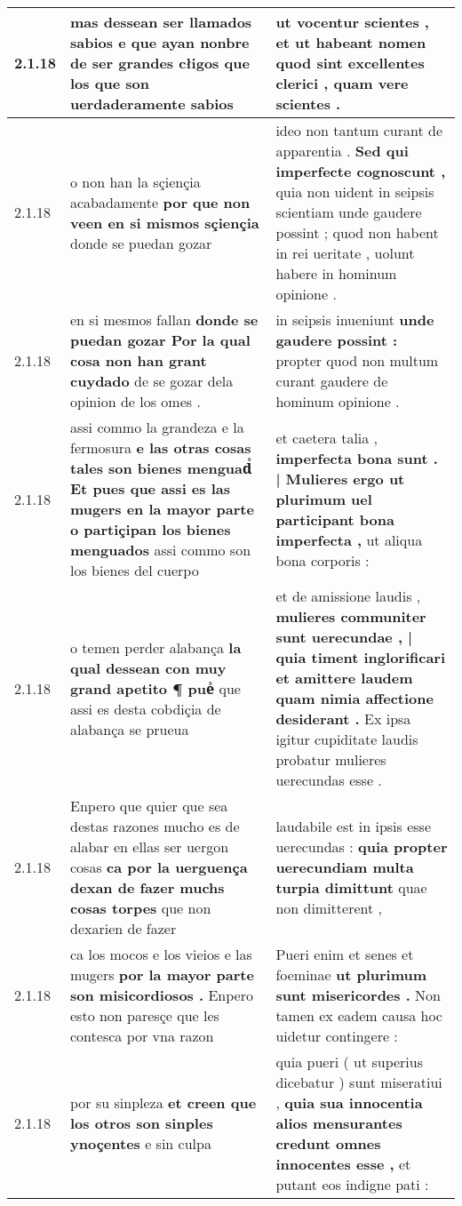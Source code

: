 \begin{tabular}{|p{1cm}|p{6.5cm}|p{6.5cm}|}
2.1.18 & mas dessean ser llamados sabios \textbf{ e que ayan nonbre de ser grandes cłigos } que los que son uerdaderamente sabios & ut vocentur scientes , \textbf{ et ut habeant nomen quod sint excellentes clerici , } quam vere scientes . \\\hline
2.1.18 & o non han la sçiençia acabadamente \textbf{ por que non veen en si mismos sçiençia } donde se puedan gozar & ideo non tantum curant de apparentia . \textbf{ Sed qui imperfecte cognoscunt , } quia non uident in seipsis scientiam unde gaudere possint ; quod non habent in rei ueritate , uolunt habere in hominum opinione . \\\hline
2.1.18 & en si mesmos fallan \textbf{ donde se puedan gozar Por la qual cosa non han grant cuydado } de se gozar dela opinion de los omes . & in seipsis inueniunt \textbf{ unde gaudere possint : } propter quod non multum curant gaudere de hominum opinione . \\\hline
2.1.18 & assi commo la grandeza e la fermosura \textbf{ e las otras cosas tales son bienes menguadᷤ Et pues que assi es las mugers en la mayor parte o partiçipan los bienes menguados } assi commo son los bienes del cuerpo & et caetera talia , \textbf{ imperfecta bona sunt . | Mulieres ergo ut plurimum uel participant bona imperfecta , } ut aliqua bona corporis : \\\hline
2.1.18 & o temen perder alabança \textbf{ la qual dessean con muy grand apetito ¶ pueᷤ } que assi es desta cobdiçia de alabança se prueua & et de amissione laudis , \textbf{ mulieres communiter sunt uerecundae , | quia timent inglorificari et amittere laudem quam nimia affectione desiderant . } Ex ipsa igitur cupiditate laudis probatur mulieres uerecundas esse . \\\hline
2.1.18 & Enpero que quier que sea destas razones mucho es de alabar en ellas ser uergon cosas \textbf{ ca por la uerguença dexan de fazer muchs cosas torpes } que non dexarien de fazer & laudabile est in ipsis esse uerecundas : \textbf{ quia propter uerecundiam multa turpia dimittunt } quae non dimitterent , \\\hline
2.1.18 & ca los mocos e los vieios e las mugers \textbf{ por la mayor parte son misicordiosos . } Enpero esto non paresçe que les contesca por vna razon & Pueri enim et senes et foeminae \textbf{ ut plurimum sunt misericordes . } Non tamen ex eadem causa hoc uidetur contingere : \\\hline
2.1.18 & por su sinpleza \textbf{ et creen que los otros son sinples ynoçentes } e sin culpa & quia pueri ( ut superius dicebatur ) sunt miseratiui , \textbf{ quia sua innocentia alios mensurantes credunt omnes innocentes esse , } et putant eos indigne pati : \\\hline

\end{tabular}
